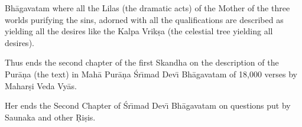 Bh\=agavatam where all the Lilas (the dramatic acts) of the Mother of the three worlds purifying the sins, adorned with all the qualifications are described as yielding all the desires like the Kalpa Vrik\d{s}a (the celestial tree yielding all desires).

Thus ends the second chapter of the first Skandha on the description of the Pur\=a\d{n}a (the text) in Mah\=a Pur\=a\d{n}a \'Sr\={\i}mad Dev\={\i} Bh\=agavatam of 18,000 verses by Mahar\d{s}i Veda Vy\=as.

Her ends the Second Chapter of \'Sr\={\i}mad Dev\={\i} Bh\=agavatam on questions put by Saunaka and other \d{R}i\d{s}is.



